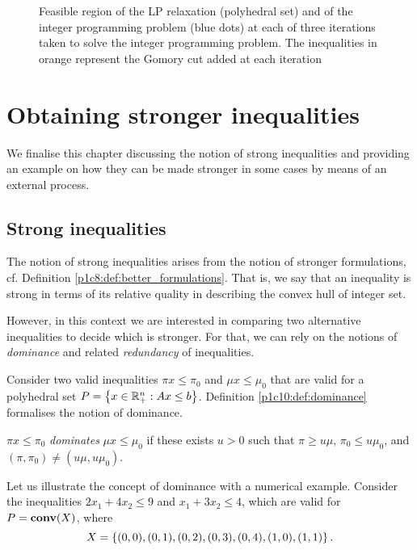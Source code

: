 \begin{figure}[h]
      \caption{Feasible region of the LP relaxation (polyhedral set) and of the integer programming problem (blue dots) at each of three iterations taken to solve the integer programming problem. The inequalities in orange represent the Gomory cut added at each iteration} \label{p1c10:fig:LP_1}	
\end{figure}


\section{Obtaining stronger inequalities}

We finalise this chapter discussing the notion of strong inequalities and providing an example on how they can be made stronger in some cases by means of an external process. 


\subsection{Strong inequalities}

The notion of strong inequalities arises from the notion of stronger formulations, cf. Definition \ref{p1c8:def:better_formulations}. That is, we say that an inequality is strong in terms of its relative quality in describing the convex hull of integer set.

However, in this context we are interested in comparing two alternative inequalities to decide which is stronger. For that, we can rely on the notions of \emph{dominance} and related \emph{redundancy} of inequalities. 

Consider two valid inequalities $\pi x \leq \pi_0$ and $\mu x \leq \mu_0$ that are valid for a polyhedral set $P = \left\{ x \in \mathbb{R}^n_+ : Ax \leq b \right \}$. Definition \ref{p1c10:def:dominance} formalises the notion of dominance.

\begin{definition}[Dominance] \label{p1c10:def:dominance}
    $\pi x \leq \pi_0$ \emph{dominates} $\mu x \leq \mu_0$ if these exists $u > 0$ such that $\pi \geq u\mu$, $\pi_0 \leq u\mu_0$, and $(\pi, \pi_0) \neq (u\mu, u\mu_0)$.
\end{definition}

Let us illustrate the concept of dominance with a numerical example. Consider the inequalities $2x_1 + 4x_2 \leq 9$ and $x_1 + 3x_2 \leq 4$, which are valid for $P = \mathop{\bf conv}(X)$, where 
	\begin{equation*}
	X = \left\{ (0,0), (0,1), (0,2), (0,3), (0,4), (1,0), (1,1) \right \}.	
	\end{equation*}
	
